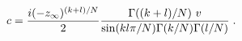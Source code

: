 \begin{equation}
c={i(-z_\infty)^{(k+l)/N} \over 2} {\Gamma ((k+l)/N)~v  \over
\sin (k l \pi/N) \Gamma (k/N) \Gamma (l/N)}\;.
\end{equation} 
